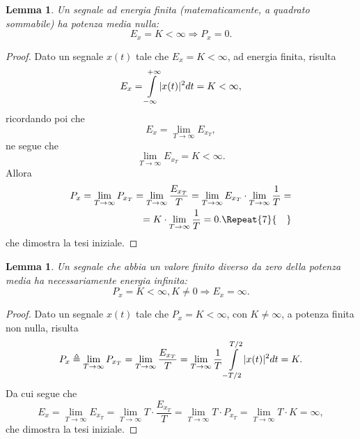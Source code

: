 \documentclass[12pt,oneside,openany]{memoir}
\numberwithin{equation}{subsection}
\newtheorem{lemma}[theorem]{Lemma}
\DeclarePairedDelimiter{\abs}{\lvert}{\rvert}
\newcommand{\quads}[1]{\Repeat{#1}{\quad}}
\begin{document}
\begin{lemma}
Un segnale ad energia finita (matematicamente, a quadrato sommabile) ha potenza
	media nulla:
\begin{equation}
	E_x = K < \infty \Longrightarrow P_x = 0.
\end{equation}
\end{lemma}
\begin{proof}
Dato un segnale $x(t)$ tale che $E_x = K < \infty$, ad energia finita, risulta
\begin{equation}
	E_x = \int\displaylimits_{-\infty}^{+\infty} \abs{x(t)}^2 dt = K < 
	\infty,
\end{equation}
ricordando poi che
\begin{equation}
	E_x = \lim_{T \rightarrow \infty} E_{x_T},
\end{equation}
ne segue che
\begin{equation}
	\lim_{T \rightarrow \infty} E_{x_T} = K < \infty.
\end{equation}
Allora
\begin{equation}
	\begin{split}
		P_x = \lim_{T \rightarrow \infty} P_{x_T} =
		\lim_{T \rightarrow \infty} \frac{E_{x_T}}{T} =
		\lim_{T \rightarrow \infty} E_{x_T} \cdot
		\lim_{T \rightarrow \infty} \frac{1}{T} =
		\\
		= K \cdot \lim_{T \rightarrow \infty} \frac{1}{T} = 0.
		\quads{7}
	\end{split}
\end{equation}
che dimostra la tesi iniziale.
\end{proof}

\begin{lemma}
Un segnale che abbia un valore finito diverso da zero della potenza media ha
	necessariamente energia infinita:
\begin{equation}
	P_x = K < \infty, K \neq 0 \Longrightarrow E_x = \infty.
\end{equation}
\end{lemma}
\begin{proof}
Dato un segnale $x(t)$ tale che $P_x = K < \infty$, con $K \neq \infty$, a
	potenza finita non nulla, risulta
\begin{equation}
	P_x \triangleq \lim_{T \rightarrow \infty} P_{x_T} =
	\lim_{T \rightarrow \infty} \frac{E_{x_T}}{T} = 
	\lim_{T \rightarrow \infty} \frac{1}{T} 
	\int\displaylimits_{-T/2}^{T/2} \abs{x(t)}^2 dt = K.
\end{equation}
Da cui segue che
\begin{equation}
	E_x = \lim_{T \rightarrow \infty} E_{x_T} = \lim_{T \rightarrow \infty}
	T \cdot \frac{E_{x_T}}{T} = \lim_{T \rightarrow \infty} T \cdot P_{x_T}
	= \lim_{T \rightarrow \infty} T \cdot K = \infty,
\end{equation}
che dimostra la tesi iniziale.
\end{proof}
\end{document}
